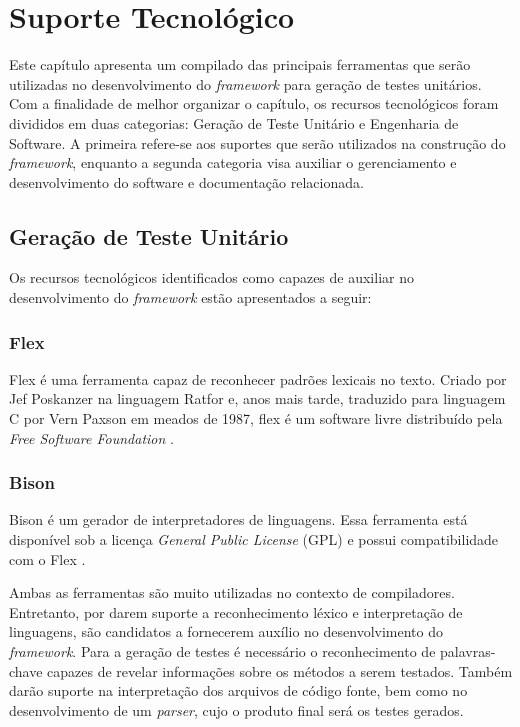 \chapter[Suporte Tecnológico]{Suporte Tecnológico}
Este capítulo apresenta um compilado das principais ferramentas que serão utilizadas no desenvolvimento do \textit{framework} para geração de testes unitários. Com a finalidade de melhor organizar o capítulo, os recursos tecnológicos foram divididos em duas categorias: Geração de Teste Unitário e Engenharia de Software. A primeira refere-se aos suportes que serão utilizados na construção do \textit{framework}, enquanto a segunda categoria visa auxiliar o gerenciamento e desenvolvimento do software e documentação relacionada.

\section{Geração de Teste Unitário}
Os recursos tecnológicos identificados como capazes de auxiliar no desenvolvimento do \textit{framework} estão apresentados a seguir:

\subsection{Flex}
Flex é uma ferramenta capaz de reconhecer padrões lexicais no texto. Criado por Jef Poskanzer na linguagem Ratfor e, anos mais tarde, traduzido para linguagem C por Vern Paxson em meados de 1987, flex é um software livre distribuído pela \textit{Free Software Foundation} \cite{flex2008}.

\subsection{Bison}
Bison é um gerador de interpretadores de linguagens. Essa ferramenta está disponível sob a licença \textit{General Public License} (GPL) e possui compatibilidade com o Flex \cite{bison2014}.
\par
\indent Ambas as ferramentas são muito utilizadas no contexto de compiladores. Entretanto, por darem suporte a reconhecimento léxico e interpretação de linguagens, são candidatos a fornecerem auxílio no desenvolvimento do \textit{framework}. Para a geração de testes é necessário o reconhecimento de palavras-chave capazes de revelar informações sobre os métodos a serem testados. Também darão suporte na interpretação dos arquivos de código fonte, bem como no desenvolvimento de um \textit{parser}, cujo o produto final será os testes gerados.

